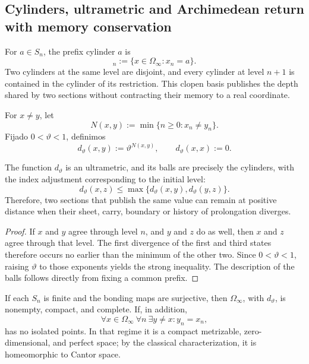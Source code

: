 \subsection{Cylinders, ultrametric and Archimedean return with memory conservation}

For \(a\in S_n\), the prefix cylinder \(a\) is
\begin{equation}
 [a]_n:=\{x\in\Omega_\infty:x_n=a\}.
 \label{eq:cilindro-genealogico-rev3}
\end{equation}
Two cylinders at the same level are disjoint, and every cylinder at level
\(n+1\) is contained in the cylinder of its restriction. This clopen
basis publishes the depth shared by two sections without
contracting their memory to a real coordinate.

For \(x\neq y\), let
\[
 N(x,y):=\min\{n\geq0:x_n\neq y_n\}.
\]
Fijado \(0<\vartheta<1\), definimos
\begin{equation}
 d_\vartheta(x,y):=\vartheta^{N(x,y)},
 \qquad d_\vartheta(x,x):=0.
 \label{eq:ultrametrica-genealogica-rev3}
\end{equation}

\begin{proposition}
\label{prop:ultrametrica-genealogica-rev3}
The function \(d_\vartheta\) is an ultrametric, and its balls are precisely
the cylinders, with the index adjustment corresponding to the initial level:
\[
 d_\vartheta(x,z)
 \leq
 \max\{d_\vartheta(x,y),d_\vartheta(y,z)\}.
\]
Therefore, two sections that publish the same value can remain at
positive distance when their sheet, carry, boundary or
history of prolongation diverges.
\end{proposition}

\begin{proof}
If \(x\) and \(y\) agree through level \(n\), and \(y\) and \(z\) do as well,
then \(x\) and \(z\) agree through that level. The first divergence of the
first and third states therefore occurs no earlier than the minimum of
the other two. Since \(0<\vartheta<1\), raising \(\vartheta\) to those
exponents yields the strong inequality. The description of the balls follows
directly from fixing a common prefix.
\end{proof}

\begin{theorem}
\label{thm:compacidad-ultrametrica-genealogica-rev3}
If each \(S_n\) is finite and the bonding maps are surjective, then
\(\Omega_\infty\), with \(d_\vartheta\), is nonempty, compact, and complete.
If, in addition,
\begin{equation}
 \forall x\in\Omega_\infty\ \forall n\ \exists y\neq x:
 y_n=x_n,
 \label{eq:perfeccion-genealogica-rev3}
\end{equation}
has no isolated points. In that regime it is a compact metrizable,
zero-dimensional, and perfect space; by the classical characterization, it is homeomorphic
to Cantor space.
\end{theorem}

